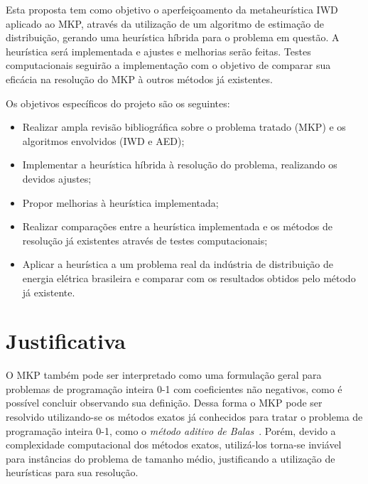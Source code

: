 \documentclass[brazil]{article}
\begin{document}

Esta proposta tem como objetivo o aperfeiçoamento da metaheurística IWD
aplicado ao MKP, através da utilização de um algoritmo de estimação de distribuição,
gerando uma heurística híbrida para o problema em questão.
A heurística será implementada e ajustes e melhorias serão feitas.
Testes computacionais seguirão a implementação com o objetivo de comparar sua
eficácia na resolução do MKP à outros métodos já existentes.

Os objetivos específicos do projeto são os seguintes:

\begin{itemize}
  \item{Realizar ampla revisão bibliográfica sobre o problema tratado (MKP) e os algoritmos envolvidos (IWD e AED);}
  \item{Implementar a heurística híbrida à resolução do problema, realizando os devidos ajustes;}
  \item{Propor melhorias à heurística implementada;}
  \item{Realizar comparações entre a heurística implementada e os métodos de resolução já existentes através de testes computacionais;}
  \item{Aplicar a heurística a um problema real da indústria de distribuição de e\-ner\-gia elétrica brasileira e comparar com os resultados obtidos pelo método já existente.}
\end{itemize}

\section{Justificativa}
\label{sec:justificativa}

\nocite{Martello-1990}

O MKP também pode ser interpretado como uma formulação geral para pro\-ble\-mas de
programação inteira 0-1 com coeficientes não ne\-ga\-ti\-vos, como é possível
concluir observando sua definição.
Dessa forma o MKP pode ser resolvido utilizando-se os métodos exatos já
conhecidos para tratar o problema de programação inteira 0-1, como o \textit{método
aditivo de Balas}~\cite{Balas-1965}.
Porém, devido a complexidade computacional dos métodos exatos, utilizá-los
torna-se inviável para instâncias do problema de tamanho médio,
justificando a utilização de heurísticas para sua resolução.
\end{document}
